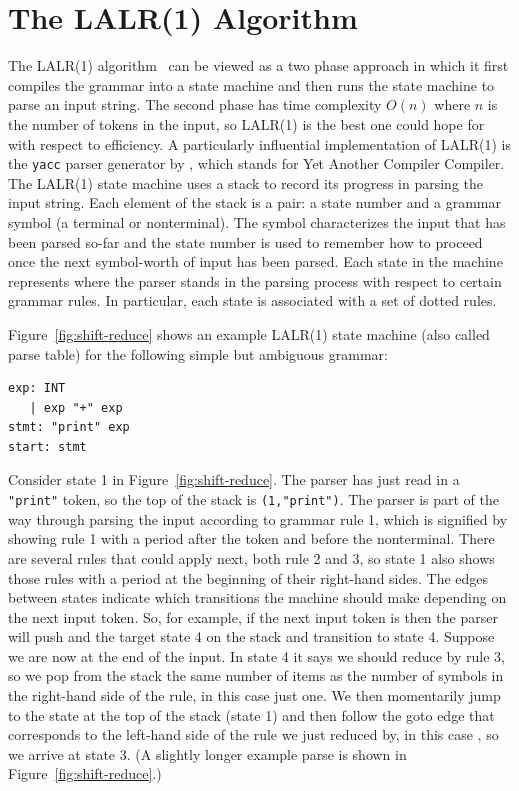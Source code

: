 \documentclass[7x10]{TimesAPriori_MIT}%
\numberwithin{theorem}{chapter}
\numberwithin{definition}{chapter}
\numberwithin{equation}{chapter}
\begin{document}
{\section{The LALR(1) Algorithm}
\label{sec:lalr}

The LALR(1) algorithm~\citep{DeRemer69,Anderson73} can be viewed as a
two phase approach in which it first compiles the grammar into a state
machine and then runs the state machine to parse an input string.  The
second phase has time complexity $O(n)$ where $n$ is the number of
tokens in the input, so LALR(1) is the best one could hope for with
respect to efficiency.
%
A particularly influential implementation of LALR(1) is the
\texttt{yacc} parser generator by \citet{Johnson:1979qy}, which stands
for Yet Another Compiler Compiler.
%
The LALR(1) state machine uses a stack to record its progress in
parsing the input string.  Each element of the stack is a pair: a
state number and a grammar symbol (a terminal or nonterminal). The
symbol characterizes the input that has been parsed so-far and the
state number is used to remember how to proceed once the next
symbol-worth of input has been parsed.  Each state in the machine
represents where the parser stands in the parsing process with respect
to certain grammar rules. In particular, each state is associated with
a set of dotted rules.

Figure~\ref{fig:shift-reduce} shows an example LALR(1) state machine
(also called parse table) for the following simple but ambiguous
grammar:
\begin{lstlisting}[escapechar=$]
exp: INT
   | exp "+" exp
stmt: "print" exp
start: stmt
\end{lstlisting}
Consider state 1 in Figure~\ref{fig:shift-reduce}. The parser has just
read in a \lstinline{"print"} token, so the top of the stack is
\lstinline{(1,"print")}. The parser is part of the way through parsing
the input according to grammar rule 1, which is signified by showing
rule 1 with a period after the  token and before the
 nonterminal. There are several rules that could apply next,
both rule 2 and 3, so state 1 also shows those rules with a period at
the beginning of their right-hand sides. The edges between states
indicate which transitions the machine should make depending on the
next input token. So, for example, if the next input token is
 then the parser will push  and the target state 4
on the stack and transition to state 4.  Suppose we are now at the end
of the input. In state 4 it says we should reduce by rule 3, so we pop
from the stack the same number of items as the number of symbols in
the right-hand side of the rule, in this case just one.  We then
momentarily jump to the state at the top of the stack (state 1) and
then follow the goto edge that corresponds to the left-hand side of
the rule we just reduced by, in this case , so we arrive at
state 3.  (A slightly longer example parse is shown in
Figure~\ref{fig:shift-reduce}.)

}
\end{document}
